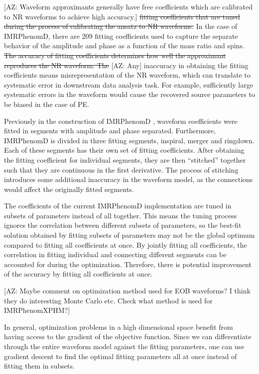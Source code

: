 \documentclass[twocolumn]{aastex631}
\newcommand{\AZ}[1]{{\color{Burnt}[AZ: #1]}}
\begin{document}
\AZ{Waveform approximants generally have free coefficients which are calibrated
to NR waveforms to achieve high accuracy.}
\sout{ fitting coefficients that are tuned during
the process of calibrating the ansatz to NR waveforms.} In the case of
IMRPhenomD, there are 209 fitting coefficients used to capture the separate
behavior of the amplitude and phase as a function of the mass ratio and spins.
\sout{The accuracy of fitting coefficients determines how well the approximant
reproduces the NR waveform. 
The}
\AZ{Any} inaccuracy in obtaining the fitting coefficients
means misrepresentation of the NR waveform, which can translate to systematic
error in downstream data analysis task. For example, sufficiently large
systematic errors in the waveform would cause the recovered source parameters to be biased
in the case of PE.

Previously in the construction of IMRPhenomD \citep{Khan:2015jqa}, waveform
coefficients were fitted in segments with amplitude and phase separated.
Furthermore, IMRPhenomD is divided in three fitting segments, inspiral, merger and ringdown.
Each of these segments has their own set of fitting coefficients.
After obtaining the fitting coefficient for individual segments, they are then ``stitched'' together such that they are continuous in the first derivative.
The process of stitching introduces some additional
inaccuracy in the waveform model, as the connections would affect the originally
fitted segments.

The coefficients of the current IMRPhenomD implementation are tuned in subsets
of parameters instead of all together. This means the tuning process ignores the
correlation between different subsets of parameters, so the best-fit
solution obtained by fitting subsets of parameters may not be the global
optimum compared to fitting all coefficients at once. By jointly
fitting all coefficients, the correlation in fitting individual and connecting
different segments can be accounted for during the optimization. Therefore, there is
potential improvement of the accuracy by fitting all coefficients at once.

\AZ{Maybe comment on optimization method used for EOB waveforms?
I think they do interesting Monte Carlo etc. Check what method is used 
for IMRPhenomXPHM?}

In general, optimization problems in a high dimensional space benefit from
having access to the gradient of the objective function. Since we can
differentiate through the entire waveform model against the fitting parameters,
one can use gradient descent to find the optimal fitting parameters all at once
instead of fitting them in subsets.
\end{document}
